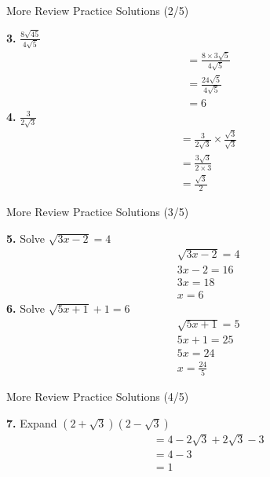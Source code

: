 \documentclass[aspectratio=169]{beamer}
\begin{document}
\begin{frame}{More Review Practice Solutions (2/5)}
\begin{tcolorbox}[colback=lightgray,colframe=primary,title=Solutions]
\footnotesize
\textbf{3.} $\frac{8\sqrt{45}}{4\sqrt{5}}$
\begin{align*}
  &= \frac{8 \times 3\sqrt{5}}{4\sqrt{5}} \\
  &= \frac{24\sqrt{5}}{4\sqrt{5}} \\
  &= 6
\end{align*}
\textbf{4.} $\frac{3}{2\sqrt{3}}$
\begin{align*}
  &= \frac{3}{2\sqrt{3}} \times \frac{\sqrt{3}}{\sqrt{3}} \\
  &= \frac{3\sqrt{3}}{2 \times 3} \\
  &= \frac{\sqrt{3}}{2}
\end{align*}
\end{tcolorbox}
\end{frame}

\begin{frame}{More Review Practice Solutions (3/5)}
\begin{tcolorbox}[colback=lightgray,colframe=primary,title=Solutions]
\footnotesize
\textbf{5.} Solve $\sqrt{3x-2} = 4$
\begin{align*}
  &\sqrt{3x-2} = 4 \\
  &3x-2 = 16 \\
  &3x = 18 \\
  &x = 6
\end{align*}
\vspace{0.5em}
\textbf{6.} Solve $\sqrt{5x+1} + 1 = 6$
\begin{align*}
  &\sqrt{5x+1} = 5 \\
  &5x+1 = 25 \\
  &5x = 24 \\
  &x = \frac{24}{5}
\end{align*}
\end{tcolorbox}
\end{frame}

\begin{frame}{More Review Practice Solutions (4/5)}
\begin{tcolorbox}[colback=lightgray,colframe=primary,title=Solutions]
\footnotesize
\textbf{7.} Expand $(2+\sqrt{3})(2-\sqrt{3})$
\begin{align*}
  &= 4 - 2\sqrt{3} + 2\sqrt{3} - 3 \\
  &= 4 - 3 \\
  &= 1
\end{align*}
\end{tcolorbox}
\end{frame}
\end{document}
